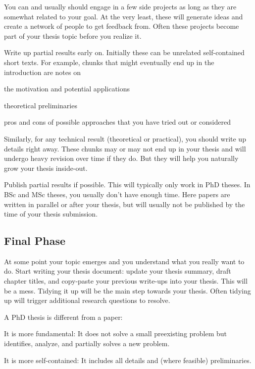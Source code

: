 \documentclass[12pt]{article}
\begin{document}
You can and usually should engage in a few side projects as long as they are somewhat related to your goal.
At the very least, these will generate ideas and create a network of people to get feedback from.
Often these projects become part of your thesis topic before you realize it.
\medskip

Write up partial results early on.
Initially these can be unrelated self-contained short texts.
For example, chunks that might eventually end up in the introduction are notes on
\begin{compactitem}
\item the motivation and potential applications
\item theoretical preliminaries
\item pros and cons of possible approaches that you have tried out or considered
\end{compactitem}
Similarly, for any technical result (theoretical or practical), you should write up details right away.
These chunks may or may not end up in your thesis and will undergo heavy revision over time if they do.
But they will help you naturally grow your thesis inside-out.

Publish partial results if possible.
This will typically only work in PhD theses. In BSc and MSc theses, you usually don't have enough time. Here papers are written in parallel or after your thesis, but will usually not be published by the time of your thesis submission.

\subsection{Final Phase}

At some point your topic emerges and you understand what you really want to do.
Start writing your thesis document: update your thesis summary, draft chapter titles, and copy-paste your previous write-ups into your thesis.
This will be a mess.
Tidying it up will be the main step towards your thesis.
Often tidying up will trigger additional research questions to resolve.
\medskip

A PhD thesis is different from a paper:
\begin{compactitem}
\item It is more fundamental: It does not solve a small preexisting problem but identifies, analyze, and partially solves a new problem.
\item It is more self-contained: It includes all details and (where feasible) preliminaries.
\end{compactitem}
\medskip
\end{document}
